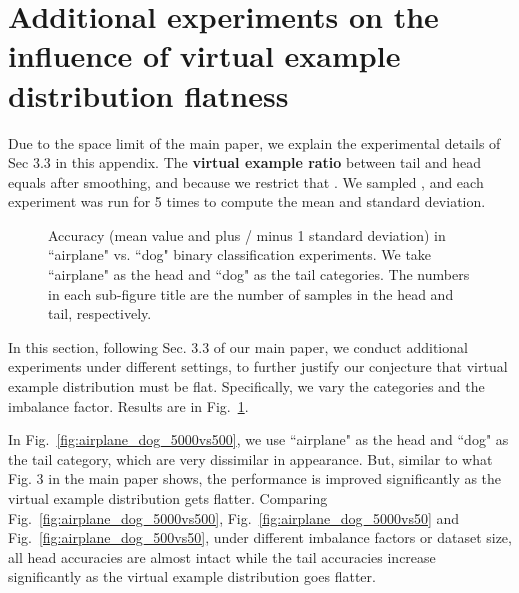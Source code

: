 \documentclass[10pt,twocolumn,letterpaper]{article}
\begin{document}
{\small


}

\clearpage

\appendix

\section{Additional experiments on the influence of virtual example distribution flatness}

Due to the space limit of the main paper, we explain the experimental details of Sec 3.3 in this appendix. The \textbf{virtual example ratio}  between tail and head equals  after smoothing, and  because we restrict that . We sampled , and each experiment was run for 5 times to compute the mean and standard deviation.

\begin{figure}
    \centering
    \caption{Accuracy (mean value and plus / minus 1 standard deviation) in ``airplane" vs. ``dog" binary classification experiments. We take ``airplane" as the head and ``dog" as the tail categories. The numbers in each sub-figure title are the number of samples in the head and tail, respectively.}
    \label{fig.appendix_binary_experiments}
\end{figure}

In this section, following Sec. 3.3 of our main paper, we conduct additional experiments under different settings, to further justify our conjecture that virtual example distribution must be flat. Specifically, we vary the categories and the imbalance factor. Results are in Fig.~\ref{fig.appendix_binary_experiments}. 

In Fig.~\ref{fig:airplane_dog_5000vs500}, we use ``airplane" as the head and ``dog" as the tail category, which are very dissimilar in appearance. But, similar to what Fig. 3 in the main paper shows, the performance is improved significantly as the virtual example distribution gets flatter. Comparing Fig.~\ref{fig:airplane_dog_5000vs500}, Fig.~\ref{fig:airplane_dog_5000vs50} and Fig.~\ref{fig:airplane_dog_500vs50}, under different imbalance factors or dataset size, all head accuracies are almost intact while the tail accuracies increase significantly as the virtual example distribution goes flatter.
\end{document}

